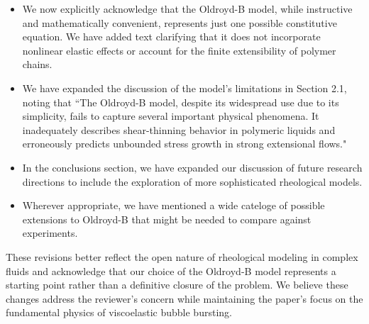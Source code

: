 \documentclass[]{article}
\newcommand{\AKD}[1]{{\textcolor{magenta}{#1}}}
\newcommand{\vsy}[1]{\todo[color=orange, bordercolor=none, textcolor=white]{Vatsal}\textcolor{orange}{#1}}
\begin{document}
\begin{enumerate}
\begin{enumerate}
        \begin{itemize}
            \item We now explicitly acknowledge that the Oldroyd-B model, while instructive and mathematically convenient, represents just one possible constitutive equation. We have added text clarifying that it does not incorporate nonlinear elastic effects or account for the finite extensibility of polymer chains.
            \item We have expanded the discussion of the model's limitations in Section 2.1, noting that ``The Oldroyd-B model, despite its widespread use due to its simplicity, fails to capture several important physical phenomena. It inadequately describes shear-thinning behavior in polymeric liquids and erroneously predicts unbounded stress growth in strong extensional flows."
            \item In the conclusions section, we have expanded our discussion of future research directions to include the exploration of more sophisticated rheological models.
            \item Wherever appropriate, we have mentioned a wide cateloge of possible extensions to Oldroyd-B that might be needed to compare against experiments.
        \end{itemize}

        These revisions better reflect the open nature of rheological modeling in complex fluids and acknowledge that our choice of the Oldroyd-B model represents a starting point rather than a definitive closure of the problem. We believe these changes address the reviewer's concern while maintaining the paper's focus on the fundamental physics of viscoelastic bubble bursting.




    \end{enumerate}


\end{enumerate}
\end{document}
